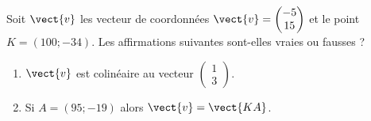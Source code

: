 
\begin{exercice}\label{exosmath-0466}

    Soit \( \vect{ v }\) les vecteur de coordonnées \( \vect{v }=\begin{pmatrix}
        -5    \\ 
        15    
    \end{pmatrix}\) et le point \( K=(100;-34)\). Les affirmations suivantes sont-elles vraies ou fausses ?
    \begin{enumerate}
        \item
            \( \vect{ v }\) est colinéaire au vecteur \( \begin{pmatrix}
                1    \\ 
                3    
            \end{pmatrix}\).
        \item
            Si \( A=(95;-19)\) alors \( \vect{ v }=\vect{ KA }\).
    \end{enumerate}

\end{exercice}
